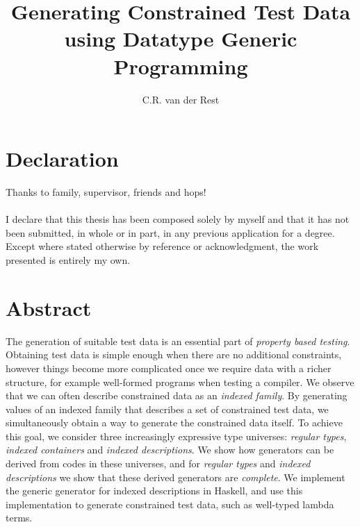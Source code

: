 \documentclass[a4paper,msc,twosized=semi]{uustthesis}
\title{Generating Constrained Test Data using Datatype Generic Programming}
\author{C.R. van der Rest}
\begin{document}
\maketitle


\frontmatter
\tableofcontents

\chapter{Declaration}
Thanks to family, supervisor, friends and hops!
\\ \\
I declare that this thesis has been composed solely by myself and that it has not been
submitted, in whole or in part, in any previous application for a degree. Except where
stated otherwise by reference or acknowledgment, the work presented is entirely my
own.

\chapter{Abstract}
The generation of suitable test data is an essential part of \emph{property based testing}. Obtaining test data is simple enough when there are no additional constraints, however things become more complicated once we require data with a richer structure, for example well-formed programs when testing a compiler. We observe that we can often describe constrained data as an \emph{indexed family}. By generating values of an indexed family that describes a set of constrained test data, we simultaneously obtain a way to generate the constrained data itself. To achieve this goal, we consider three increasingly expressive type universes: \emph{regular types}, \emph{indexed containers} and \emph{indexed descriptions}. We show how generators can be derived from codes in these universes, and for \emph{regular types} and \emph{indexed descriptions} we show that these derived generators are \emph{complete}. We implement the generic generator for indexed descriptions in Haskell, and use this implementation to generate constrained test data, such as well-typed lambda terms. 

\mainmatter
\end{document}
